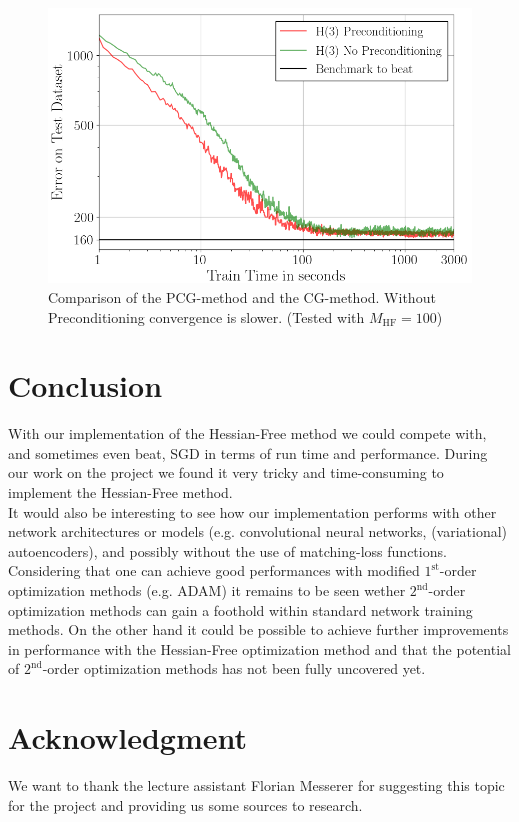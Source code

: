 \documentclass[conference]{IEEEtran}
\begin{document}
\begin{figure}[htbp]
	\centerline{\includegraphics[scale=0.53]{Precond.png}}
	\caption{Comparison of the PCG-method and the CG-method. Without Preconditioning convergence is slower. (Tested with $M_{\mathrm{HF}}=100$)}
	\label{fig4}
\end{figure}



\section{Conclusion}
\noindent
With our implementation of the Hessian-Free method we could compete with, and sometimes even beat, SGD in terms of run time and performance.
During our work on the project we found it very tricky and time-consuming to implement the Hessian-Free method.\\
It would also be interesting to see how our implementation performs with other network architectures or models (e.g. convolutional neural networks, (variational) autoencoders), and possibly without the use of matching-loss functions.\\
Considering that one can achieve good performances with modified $1^{\text{st}}$-order optimization methods (e.g. ADAM) it remains to be seen wether $2^{\text{nd}}$-order optimization methods can gain a foothold within standard network training methods. On the other hand it could be possible to achieve further improvements in performance with the Hessian-Free optimization method and that the potential of $2^{\text{nd}}$-order optimization methods has not been fully uncovered yet.

\section*{Acknowledgment}
\noindent
We want to thank the lecture assistant Florian Messerer for suggesting this topic for the project and providing us some sources to research.
\end{document}
